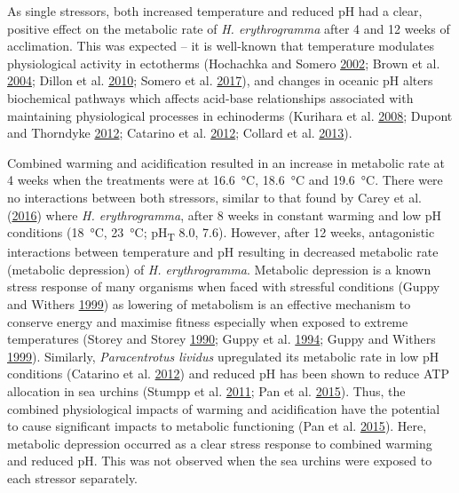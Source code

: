 \documentclass[a4paper,10pt, oneside]{memoir}
\begin{document}
As single stressors, both increased temperature and reduced pH had a clear, positive effect on the metabolic rate of \textit{H. erythrogramma} after 4 and 12 weeks of acclimation.
This was expected -- it is well-known that temperature modulates physiological activity in ectotherms (Hochachka and Somero \protect\hyperlink{ref-Hochachka2002}{2002}; Brown et al. \protect\hyperlink{ref-Brown2004}{2004}; Dillon et al. \protect\hyperlink{ref-Dillon2010}{2010}; Somero et al. \protect\hyperlink{ref-Somero2017}{2017}), and changes in oceanic pH alters biochemical pathways which affects acid-base relationships associated with maintaining physiological processes in echinoderms (Kurihara et al. \protect\hyperlink{ref-Kurihara2008}{2008}; Dupont and Thorndyke \protect\hyperlink{ref-Dupont2012}{2012}; Catarino et al. \protect\hyperlink{ref-Catarino2012}{2012}; Collard et al. \protect\hyperlink{ref-Collard2013}{2013}).

Combined warming and acidification resulted in an increase in metabolic rate at 4 weeks when the treatments were at \SI{16.6}{\celsius}, \SI{18.6}{\celsius} and \SI{19.6}{\celsius}.
There were no interactions between both stressors, similar to that found by Carey et al. (\protect\hyperlink{ref-Carey2016}{2016}) where \textit{H. erythrogramma}, after 8 weeks in constant warming and low pH conditions (\SI{18}{\celsius}, \SI{23}{\celsius}; \si{pH_T} 8.0, 7.6).
However, after 12 weeks, antagonistic interactions between temperature and pH resulting in decreased metabolic rate (metabolic depression) of \textit{H. erythrogramma}.
Metabolic depression is a known stress response of many organisms when faced with stressful conditions (Guppy and Withers \protect\hyperlink{ref-Guppy1999}{1999}) as lowering of metabolism is an effective mechanism to conserve energy and maximise fitness especially when exposed to extreme temperatures (Storey and Storey \protect\hyperlink{ref-Storey1990}{1990}; Guppy et al. \protect\hyperlink{ref-Guppy1994}{1994}; Guppy and Withers \protect\hyperlink{ref-Guppy1999}{1999}).
Similarly, \textit{Paracentrotus lividus} upregulated its metabolic rate in low pH conditions (Catarino et al. \protect\hyperlink{ref-Catarino2012}{2012}) and reduced pH has been shown to reduce ATP allocation in sea urchins (Stumpp et al. \protect\hyperlink{ref-Stumpp2011}{2011}; Pan et al. \protect\hyperlink{ref-Pan2015}{2015}).
Thus, the combined physiological impacts of warming and acidification have the potential to cause significant impacts to metabolic functioning (Pan et al. \protect\hyperlink{ref-Pan2015}{2015}).
Here, metabolic depression occurred as a clear stress response to combined warming and reduced pH.
This was not observed when the sea urchins were exposed to each stressor separately.
\end{document}
